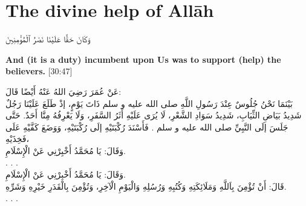 \chapter{The divine help of All\=ah} 

\begin{center}
    \begin{RLtext}
            وَكَانَ حَقًّا عَلَيْنَا نَصْرُ ٱلْمُؤْمِنِينَ 
    \end{RLtext}
    \textbf{And (it is a duty) incumbent upon Us was to support (help) the believers.} [30:47]
\end{center}
\begin{RLtext}
    عَنْ عُمَرَ رَضِيَ اللهُ عَنْهُ أَيْضًا قَالَ:\\
    بَيْنَمَا نَحْنُ جُلُوسٌ عِنْدَ رَسُولِ اللَّهِ صلى الله عليه و سلم ذَاتَ يَوْمٍ، إذْ طَلَعَ عَلَيْنَا رَجُلٌ شَدِيدُ بَيَاضِ الثِّيَابِ، شَدِيدُ سَوَادِ الشَّعْرِ، لَا يُرَى عَلَيْهِ أَثَرُ السَّفَرِ، وَلَا يَعْرِفُهُ مِنَّا أَحَدٌ. حَتَّى جَلَسَ إلَى النَّبِيِّ صلى الله عليه و سلم . فَأَسْنَدَ رُكْبَتَيْهِ إلَى رُكْبَتَيْهِ، وَوَضَعَ كَفَّيْهِ عَلَى فَخِذَيْهِ،\\
    وَقَالَ: يَا مُحَمَّدُ أَخْبِرْنِي عَنْ الْإِسْلَامِ.\\
    . . .\\
    وَقَالَ: يَا مُحَمَّدُ أَخْبِرْنِي عَنْ الْإِسْلَامِ.\\
    قَالَ: أَنْ تُؤْمِنَ بِاَللَّهِ وَمَلَائِكَتِهِ وَكُتُبِهِ وَرُسُلِهِ وَالْيَوْمِ الْآخِرِ، وَتُؤْمِنَ بِالْقَدَرِ خَيْرِهِ وَشَرِّهِ.\\
    . . .\\
    [رَوَاهُ مُسْلِمٌ]
\end{RLtext}
